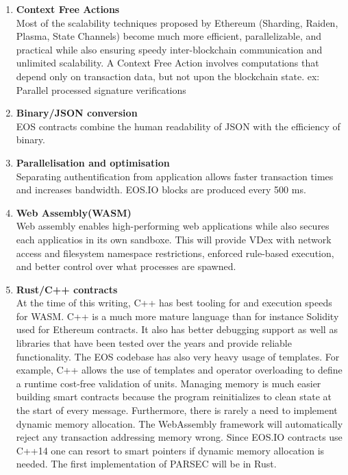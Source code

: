 \documentclass[]{article}
\begin{document}
	\begin{enumerate}
					
			\item \textbf{Context Free Actions} \\
		Most of the scalability techniques proposed by Ethereum (Sharding, Raiden, Plasma, State Channels) 
		become much more efficient, parallelizable, and practical while also ensuring speedy inter-blockchain communication and unlimited scalability.
		A Context Free Action involves computations that depend only on transaction data, but not upon the blockchain state.
		ex: Parallel processed signature verifications\\
		
		\item\textbf{ Binary/JSON conversion} \\
		 EOS contracts combine the human readability of JSON with the efficiency of binary. \\
	
		\item \textbf{Parallelisation and optimisation\\ } 
		Separating authentification from application allows faster transaction times and increases bandwidth.
		EOS.IO blocks are produced every 500 ms.
		
	\item \textbf{Web Assembly(WASM)}   \\
	Web assembly enables high-performing web applications while also secures each applicatios in its own sandboxe.
	This will provide VDex with network access and
	filesystem namespace restrictions, enforced rule-based execution, and better control over what processes are spawned.
	
	\item \textbf{Rust/C++ contracts\\}
	At the time of this writing,
	C++ has best tooling for and execution speeds for WASM.
	C++ is a much more mature language than for instance Solidity used for Ethereum contracts.
	It also has better debugging support as well as libraries that have been tested over the years and provide reliable functionality. 
	The EOS codebase has also very heavy usage of templates.
	For example, C++ allows the use of templates and operator overloading to define a runtime cost-free validation of units.
	Managing memory is much easier building smart contracts because the
	program reinitializes to clean state at the start of every message. Furthermore, there is rarely a need to implement dynamic memory allocation. 
	The WebAssembly framework will automatically reject any transaction addressing memory wrong.
	Since EOS.IO contracts use C++14 one can resort to smart pointers if dynamic memory allocation is needed.
	The first implementation of PARSEC will be in Rust.\cite{23}
	 	

\end{enumerate}
\end{document}

